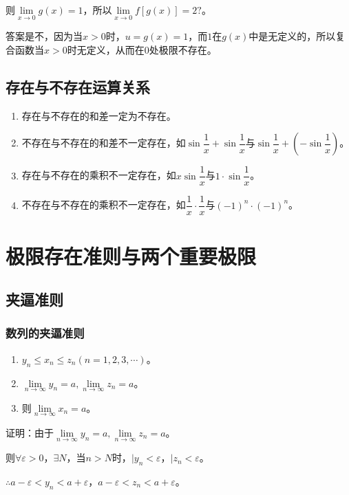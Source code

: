 \documentclass[UTF8, 12pt]{ctexart}
\begin{document}
则$\lim\limits_{x\to 0}g(x)=1$，所以$\lim\limits_{x\to 0}f[g(x)]=2?$。

答案是不，因为当$x>0$时，$u=g(x)=1$，而$1$在$g(x)$中是无定义的，所以复合函数当$x>0$时无定义，从而在$0$处极限不存在。

\subsection{存在与不存在运算关系}

\begin{enumerate}
    \item 存在与不存在的和差一定为不存在。
    \item 不存在与不存在的和差不一定存在，如$\sin\dfrac{1}{x}+\sin\dfrac{1}{x}$与$\sin\dfrac{1}{x}+\left(-\sin\dfrac{1}{x}\right)$。
    \item 存在与不存在的乘积不一定存在，如$x\sin\dfrac{1}{x}$与$1\cdot\sin\dfrac{1}{x}$。
    \item 不存在与不存在的乘积不一定存在，如$\dfrac{1}{x}\cdot\dfrac{1}{x}$与$(-1)^n\cdot(-1)^n$。
\end{enumerate}

\section{极限存在准则与两个重要极限}

\subsection{夹逼准则}

\subsubsection{数列的夹逼准则}

\begin{enumerate}
    \item $y_n\leqslant x_n\leqslant z_n(n=1,2,3,\cdots)$。
    \item $\lim\limits_{n\to\infty}y_n=a,\lim\limits_{n\to\infty}z_n=a$。
    \item 则$\lim\limits_{n\to\infty}x_n=a$。
\end{enumerate}

证明：由于$\lim\limits_{n\to\infty}y_n=a,\lim\limits_{n\to\infty}z_n=a$。

则$\forall\varepsilon>0$，$\exists N$，当$n>N$时，$\vert y_n<\varepsilon$，$\vert z_n<\varepsilon$。

$\therefore a-\varepsilon<y_n<a+\varepsilon$，$a-\varepsilon<z_n<a+\varepsilon$。
\end{document}

